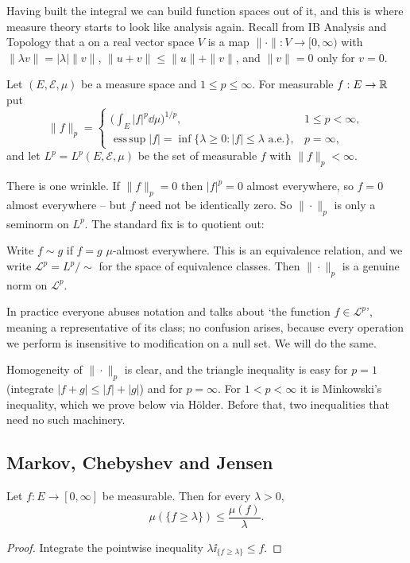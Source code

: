 \documentclass[a4paper]{scrartcl}
\newcommand{\cE}{\mathcal{E}}
\newcommand{\cL}{\mathcal{L}}
\DeclareMathOperator*{\esssup}{ess\,sup}
\newcommand{\ind}{\ii}
\begin{document}
Having built the integral we can build function spaces out of it, and this is where measure theory starts to look like analysis again. Recall from IB Analysis and Topology that a  on a real vector space $V$ is a map $\|\cdot\| : V \to [0,\infty)$ with $\|\lambda v\| = |\lambda|\|v\|$, $\|u+v\|\leq\|u\|+\|v\|$, and $\|v\|=0$ only for $v=0$.

\begin{definition}[$L^p$ spaces]
	Let $(E,\cE,\mu)$ be a measure space and $1 \leq p \leq \infty$. For measurable $f : E \to \mathbb{R}$ put
	$$
	\|f\|_p = \begin{cases}
		\Big( \int_E |f|^p \dd\mu\Big)^{1/p}, & 1 \leq p < \infty,\\[4pt]
		\esssup |f| = \inf\{\lambda \geq 0 : |f| \leq \lambda \text{ a.e.}\}, & p = \infty,
	\end{cases}
	$$
	and let $L^p = L^p(E,\cE,\mu)$ be the set of measurable $f$ with $\|f\|_p < \infty$.
\end{definition}

There is one wrinkle. If $\|f\|_p = 0$ then $|f|^p = 0$ almost everywhere, so $f = 0$ almost everywhere -- but $f$ need not be identically zero. So $\|\cdot\|_p$ is only a seminorm on $L^p$. The standard fix is to quotient out:

\begin{definition}
	Write $f \sim g$ if $f = g$ $\mu$-almost everywhere. This is an equivalence relation, and we write $\cL^p = L^p/\!\sim$ for the space of equivalence classes. Then $\|\cdot\|_p$ is a genuine norm on $\cL^p$.
\end{definition}

In practice everyone abuses notation and talks about `the function $f \in \cL^p$', meaning a representative of its class; no confusion arises, because every operation we perform is insensitive to modification on a null set. We will do the same.

Homogeneity of $\|\cdot\|_p$ is clear, and the triangle inequality is easy for $p=1$ (integrate $|f+g|\leq|f|+|g|$) and for $p=\infty$. For $1<p<\infty$ it is Minkowski's inequality, which we prove below via H\"older. Before that, two inequalities that need no such machinery.

\subsection{Markov, Chebyshev and Jensen}

\begin{proposition}\label{prop:markov}
	Let $f : E \to[0,\infty]$ be measurable. Then for every $\lambda>0$,
	$$
	\mu(\{f \geq \lambda\}) \leq \frac{\mu(f)}{\lambda}.
	$$
\end{proposition}
\begin{proof}
	Integrate the pointwise inequality $\lambda\ind_{\{f\geq\lambda\}} \leq f$.
\end{proof}
\end{document}

